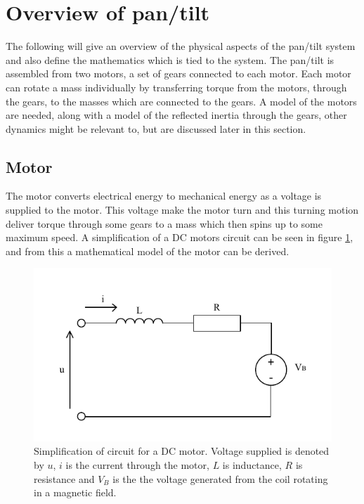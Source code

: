 \section{Overview of pan/tilt}
The following will give an overview of the physical aspects of the pan/tilt system and also define the mathematics which is tied to the system. The pan/tilt is assembled from two motors, a set of gears connected to each motor. Each motor can rotate a mass individually by transferring torque from the motors, through the gears, to the masses which are connected to the gears. A model of the motors are needed, along with a model of the reflected inertia through the gears, other dynamics might be relevant to, but are discussed later in this section.

\subsection{Motor}
The motor converts electrical energy to mechanical energy as a voltage is supplied to the motor. This voltage make the motor turn and this turning motion deliver torque through some gears to a mass which then spins up to some maximum speed. A simplification of a DC motors circuit can be seen in figure \ref{fig:motor_circuit}, and from this a mathematical model of the motor can be derived.
\begin{figure}[htb]
	\centering
	\includegraphics[scale=1,clip,trim=0 10 0 10]{graphics/motor_circuit.pdf} %
	\caption{Simplification of circuit for a DC motor. Voltage supplied is denoted by $u$, $i$ is the current through the motor, $L$ is inductance, $R$ is resistance and $V_B$ is the the voltage generated from the coil rotating in a magnetic field.}
	\label{fig:motor_circuit}			%
\end{figure}
